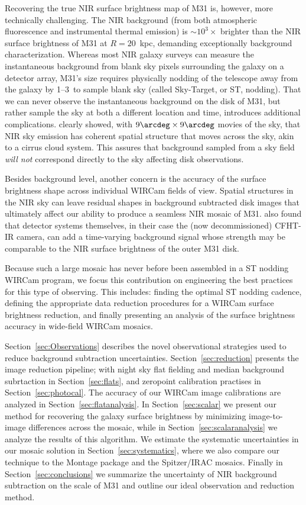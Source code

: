 \documentclass[iop]{emulateapj}
\begin{document}
Recovering the true NIR surface brightness map of M31 is, however, more technically challenging.
The NIR background (from both atmospheric fluorescence and instrumental thermal emission) is $\sim 10^3\times$ brighter than the NIR surface brightness of M31 at $R=20$~kpc, demanding exceptionally background characterization.
Whereas most NIR galaxy surveys can measure the instantaneous background from blank sky pixels surrounding the galaxy on a detector array, M31's size requires physically nodding of the telescope away from the galaxy by 1\arcdeg--3\arcdeg\ to sample blank sky (called Sky-Target, or ST, nodding).
That we can never observe the instantaneous background on the disk of M31, but rather sample the sky at both a different location and time, introduces additional complications.
\cite{Adams:1996} clearly showed, with $9\arcdeg \times 9\arcdeg$ movies of the sky, that NIR sky emission has coherent spatial structure that moves across the sky, akin to a cirrus cloud system.
This assures that background sampled from a sky field \emph{will not} correspond directly to the sky affecting disk observations.

Besides background level, another concern is the accuracy of the surface brightness shape across individual WIRCam fields of view.
Spatial structures in the NIR sky can leave residual shapes in background subtracted disk images that ultimately affect our ability to produce a seamless NIR mosaic of M31.
\cite{Vaduvescu:2004} also found that detector systems themselves, in their case the (now decommissioned) CFHT-IR camera, can add a time-varying background signal whose strength may be comparable to the NIR surface brightness of the outer M31 disk.

Because such a large mosaic has never before been assembled in a ST nodding WIRCam program, we focus this contribution on engineering the best practices for this type of observing.
This includes: finding the optimal ST nodding cadence, defining the appropriate data reduction procedures for a WIRCam surface brightness reduction, and finally presenting an analysis of the surface brightness accuracy in wide-field WIRCam mosaics.

Section~\ref{sec:Observations} describes the novel observational strategies used to reduce background subtraction uncertainties.
Section~\ref{sec:reduction} presents the image reduction pipeline; with night sky flat fielding and median background subrtaction in Section~\ref{sec:flats}, and zeropoint calibration practises in Section~\ref{sec:photocal}.
The accuracy of our WIRCam image calibrations are analyzed in Section~\ref{sec:flatanalysis}.
In Section~\ref{sec:scalar} we present our method for recovering the galaxy surface brightness by minimizing image-to-image differences across the mosaic, while in Section~\ref{sec:scalaranalysis} we analyze the results of this algorithm.
We estimate the systematic uncertainties in our mosaic solution in Section~\ref{sec:systematics}, where we also compare our technique to the Montage package \citep{Berriman:2008} and the Spitzer/IRAC mosaics.
Finally in Section~\ref{sec:conclusions} we summarize the uncertainty of NIR background subtraction on the scale of M31 and outline our ideal observation and reduction method.
\end{document}
